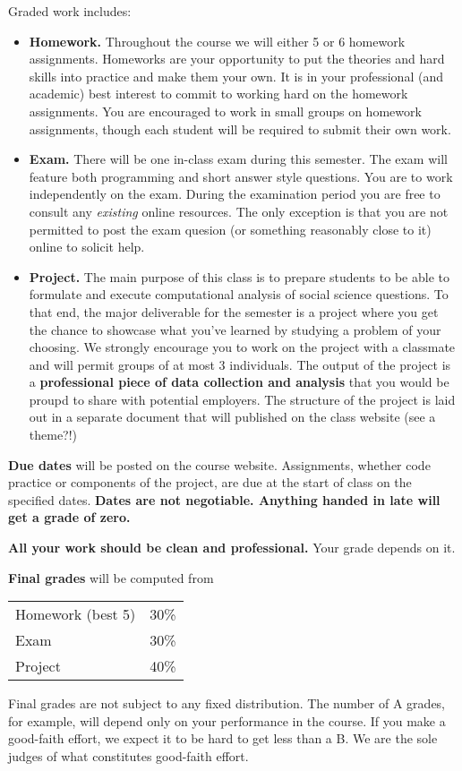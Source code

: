 \documentclass[11pt]{article}
\begin{document}
Graded work includes:
%
\begin{itemize}

\item {\bf Homework.\/} Throughout the course we will either 5 or 6 homework
assignments. Homeworks are your opportunity to put the theories and hard skills
into practice and make them your own. It is in your professional (and academic)
best interest to commit to working hard on the homework assignments. You are
encouraged to work in small groups on homework assignments, though each student
will be required to submit their own work.

\item {\bf Exam.\/}
There will be one in-class exam during this semester. The exam will feature
both programming and short answer style questions. You are to work independently on the exam. During the examination period you are free to consult any \textit{existing} online resources. The only
exception is that you are not permitted to post the exam quesion (or something
reasonably close to it) online to solicit help.

\item {\bf Project.\/}
The main purpose of this class is to prepare students to be able to formulate
and execute computational analysis of social science questions. To that end, the
major deliverable for the semester is a project where you get the chance to
showcase what you've learned by studying a problem of your choosing. We strongly
encourage you to work on the project with a classmate and will permit groups of
at most 3 individuals. The output of the project is a {\bf professional piece of
data collection and analysis\/} that you would be proupd to share with potential
employers. The structure of the project is laid out in a separate document that
will published on the class website (see a theme?!)

\end{itemize}


{\bf Due dates} will be posted on the course website.
Assignments, whether code practice or components of the project,
are due at the start of class on the specified dates.
{\bf Dates are not negotiable.
Anything handed in late will get a grade of zero.\/}

{\bf All your work should be clean and professional.}  Your grade depends on it.


{\bf Final grades\/} will be computed from
\begin{center}
\begin{tabular}{ll}
Homework (best 5) & 30\% \\
Exam        & 30\% \\
Project     & 40\% \\
\end{tabular}
\end{center}
Final grades are not subject to any fixed distribution.
The number of A grades, for example,
will depend only on your performance in the course.
If you make a good-faith effort,
we expect it to be hard to get less than a B.
We are the sole judges of what constitutes good-faith effort.
\end{document}
